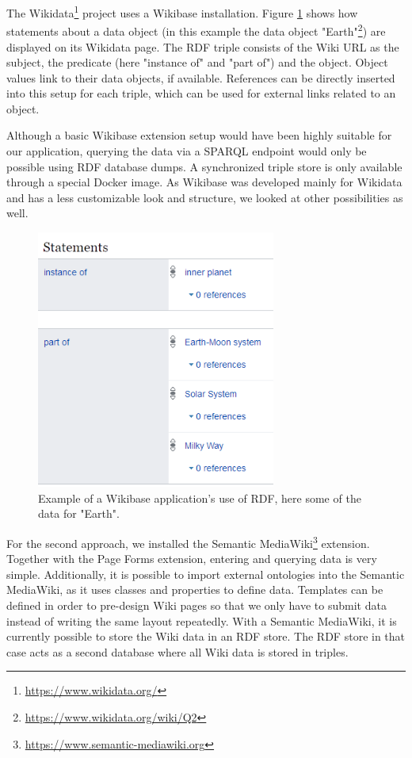 \documentclass[10pt]{article}
\begin{document}
The Wikidata\footnote{\url{https://www.wikidata.org/}} project uses a Wikibase installation. Figure \ref{fig:wikidata} shows how statements about a data object (in this example the data object "Earth"\footnote{\url{https://www.wikidata.org/wiki/Q2}}) are displayed on its Wikidata page. The RDF triple consists of the Wiki URL as the subject, the predicate (here "instance of" and "part of") and the object. Object values link to their data objects, if available. References can be directly inserted into this setup for each triple, which can be used for external links related to an object. 

Although a basic Wikibase extension setup would have been highly suitable for our application, querying the data via a SPARQL endpoint would only be possible using RDF database dumps. A synchronized triple store is only available through a special Docker image. As Wikibase was developed mainly for Wikidata and has a less customizable look and structure, we looked at other possibilities as well.\\ 


\begin{figure}
\centering
\includegraphics[width=0.7\textwidth]{img/wikidata.png}
\caption{Example of a Wikibase application's use of RDF, here some of the data for "Earth". }
\label{fig:wikidata}
\end{figure}

For the second approach, we installed the Semantic MediaWiki\footnote{\url{https://www.semantic-mediawiki.org}} extension. Together with the Page Forms extension, entering and querying data is very simple. Additionally, it is possible to import external ontologies into the Semantic MediaWiki, as it uses classes and properties to define data. Templates can be defined in order to pre-design Wiki pages so that we only have to submit data instead of writing the same layout repeatedly. With a Semantic MediaWiki, it is currently possible to store the Wiki data in an RDF store. The RDF store in that case acts as a second database where all Wiki data is stored in triples.  
\end{document}
